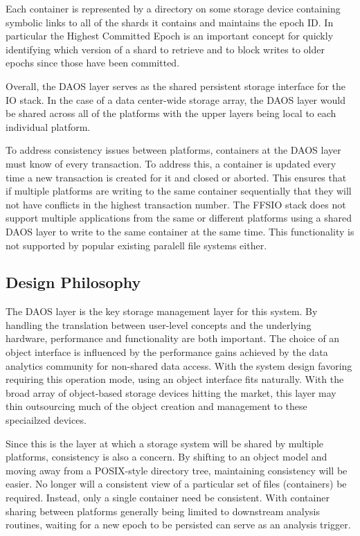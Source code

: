 \documentclass[conference]{IEEEtran} \pdfpagewidth=8.5in
\begin{document}
Each container is represented by a directory on some storage device containing
symbolic links to all of the shards it contains and maintains the epoch ID.
In particular the Highest Committed Epoch is an important concept for
quickly identifying which version of a shard to retrieve and to block writes to
older epochs since those have been committed.

Overall, the DAOS layer serves as the shared persistent storage interface for
the IO stack. In the case of a data center-wide storage array, the DAOS layer
would be shared across all of the platforms with the upper layers being local
to each individual platform.

To address consistency issues between platforms, containers at the DAOS layer
must know of every transaction. To address this, a container is updated every
time a new transaction is created for it and closed or aborted. This ensures
that if multiple platforms are writing to the same container sequentially that
they will not have conflicts in the highest transaction number. The FFSIO stack
does not support multiple applications from the same or different platforms
using a shared DAOS layer to write to the same container at the same time. This
functionality is not supported by popular existing paralell file systems
either.

\subsection{Design Philosophy}

The DAOS layer is the key storage management layer for this system. By handling
the translation between user-level concepts and the underlying hardware,
performance and functionality are both important. The choice of an object
interface is influenced by the performance gains achieved by the data analytics
community for non-shared data access. With the system design favoring requiring
this operation mode, using an object interface fits naturally. With the broad
array of object-based storage devices hitting the market, this layer may thin
outsourcing much of the object creation and management to these speciailzed
devices.

Since this is the layer at which a storage system will be shared by multiple
platforms, consistency is also a concern. By shifting to an object model and
moving away from a POSIX-style directory tree, maintaining consistency will be
easier. No longer will a consistent view of a particular set of files
(containers) be required. Instead, only a single container need be consistent.
With container sharing between platforms generally being limited to downstream
analysis routines, waiting for a new epoch to be persisted can serve as an
analysis trigger.
\end{document}
